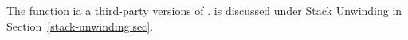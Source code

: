 \descr
The function 
ia a third-party versions of .
%
 is discussed under Stack Unwinding in
Section~\ref{stack-unwinding:sec}.
%

\argdesc

\crossreferences

%

%
